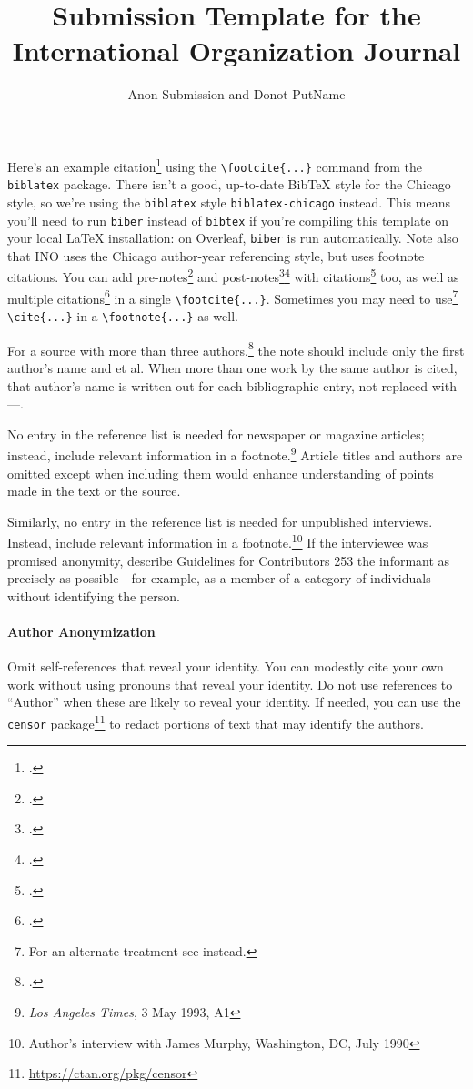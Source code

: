 \documentclass{cup-ino}
\title{Submission Template for the International Organization Journal}
\author{Anon Submission and Donot PutName}
\begin{document}
\maketitle

\begin{abstract}
\blindtext
\end{abstract}

\noindent Here's an example citation\footcite{ries:sweeney} using the \verb|\footcite{...}| command from the \texttt{biblatex} package. There isn't a good, up-to-date BibTeX style for the Chicago style, so we're using the \texttt{biblatex} style \texttt{biblatex-chicago} instead. This means you'll need to run \texttt{biber} instead of \texttt{bibtex} if you're compiling this template on your local \LaTeX{} installation: on Overleaf, \texttt{biber} is run automatically. Note also that INO uses the Chicago author-year referencing style, but uses footnote citations. You can add pre-notes\footcite[See also][]{risse:2000} and post-notes\footcite[52]{checkel:1997}\footcite[119]{grieco:1993} with citations\footcite{simmons:2001} too, as well as multiple citations\footcite{elliot:1994,kilroy:1995,pauwelyn:2015,mastanduno:1996} in a single \verb|\footcite{...}|. Sometimes you may need to use\footnote{For an alternate treatment see \cite{ussenate:chemwarfare:1984} instead.} \verb|\cite{...}| in a \verb|\footnote{...}| as well. 

For a source with more than three authors,\footcite{inman:etal:2013} the note should include only the first author's name and et al. When more than one work by the same author is cited, that author's name is written out for each bibliographic entry, not replaced with ---.

No entry in the reference list is needed for newspaper or magazine articles; instead, include relevant information in a footnote.\footnote{\emph{Los Angeles Times}, 3 May 1993, A1} Article titles and authors are omitted except when including them would enhance understanding of points made in the text or the source.

Similarly, no entry in the reference list is needed for unpublished interviews. Instead, include relevant information in a footnote.\footnote{Author's interview with James Murphy, Washington, DC, July 1990} If the interviewee was promised anonymity, describe Guidelines for Contributors 253 the informant as precisely as possible---for example, as a member of a category of individuals---without identifying the person.

\paragraph{Author Anonymization}
Omit self-references that reveal your identity. You can modestly cite your own work without using pronouns that reveal your identity. Do not use references to ``Author'' when these are likely to reveal your identity. If needed, you can use the \texttt{censor} package\footnote{\url{https://ctan.org/pkg/censor}} to redact portions of text that may identify the authors.
\end{document}
